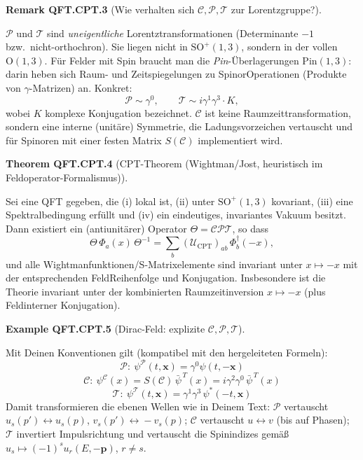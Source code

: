 \documentclass[10pt, letterpaper]{article}
\newcommand{\SO}{\mathrm{SO}}
\newcommand{\Pin}{\mathrm{Pin}}
\newcommand{\Ogroup}{\mathrm{O}}
\newcommand{\CustomHeading}[3]{%
  \par\medskip\noindent%
  \textbf{#1 #2} \textnormal{(#3)}.\enskip%
}
\newenvironment{THEO}[2]{\begin{unitbox}\CustomHeading{Theorem}{#1}{#2}}{\end{unitbox}}
\newenvironment{REM}[2]{\begin{unitbox}\CustomHeading{Remark}{#1}{#2}}{\end{unitbox}}
\newenvironment{EXA}[2]{\begin{unitbox}\CustomHeading{Example}{#1}{#2}}{\end{unitbox}}
\begin{document}
\begin{REM}{QFT.CPT.3}{Wie verhalten sich $\mathcal C,\mathcal P,\mathcal T$ zur Lorentzgruppe?}
$\mathcal P$ und $\mathcal T$ sind \emph{uneigentliche} Lorentztransformationen (Determinante $-1$ bzw.\ nicht-orthochron). Sie liegen nicht in $\SO^+(1,3)$, sondern in der vollen $\Ogroup(1,3)$. Für Felder mit Spin braucht man die \emph{Pin}-Überlagerungen $\Pin(1,3)$: darin heben sich Raum- und Zeitspiegelungen zu Spinor\-Operationen (Produkte von $\gamma$-Matrizen) an. Konkret:
\[
\mathcal P\sim \gamma^0,\qquad \mathcal T\sim i\gamma^1\gamma^3\cdot K,
\]
wobei $K$ komplexe Konjugation bezeichnet. $\mathcal C$ ist keine Raumzeittransformation, sondern eine interne (unitäre) Symmetrie, die Ladungsvorzeichen vertauscht und für Spinoren mit einer festen Matrix $S(\mathcal C)$ implementiert wird.
\end{REM}

\begin{THEO}{QFT.CPT.4}{CPT-Theorem (Wightman/Jost, heuristisch im Feldoperator-Formalismus)}
Sei eine QFT gegeben, die (i) lokal ist, (ii) unter $\SO^+(1,3)$ kovariant, (iii) eine Spektralbedingung erfüllt und (iv) ein eindeutiges, invariantes Vakuum besitzt. Dann existiert ein (antiunitärer) Operator $\Theta=\mathcal C\mathcal P\mathcal T$, so dass
\[
  \Theta\,\Phi_a(x)\,\Theta^{-1} = \sum_b (\mathcal U_{\mathrm{CPT}})_{ab}\, \Phi_b^\dagger(-x),
\]
und alle Wightmanfunktionen/S-Matrixelemente sind invariant unter $x\mapsto -x$ mit der entsprechenden Feld\-Reihenfolge und Konjugation. Insbesondere ist die Theorie invariant unter der kombinierten Raumzeitinversion $x\mapsto -x$ (plus Feldinterner Konjugation).
\end{THEO}

\begin{EXA}{QFT.CPT.5}{Dirac-Feld: explizite $\mathcal C,\mathcal P,\mathcal T$}
Mit Deinen Konventionen gilt (kompatibel mit den hergeleiteten Formeln):
\[
\boxed{\ \mathcal P:\ \psi^{\mathcal P}(t,\mathbf x)=\gamma^0\psi(t,-\mathbf x)\ }
\]
\[
\boxed{\ \mathcal C:\ \psi^{\mathcal C}(x)=S(\mathcal C)\,\bar\psi^{\,T}(x)=i\gamma^2\gamma^0\,\bar\psi^{\,T}(x)\ }
\]
\[
\boxed{\ \mathcal T:\ \psi^{\mathcal T}(t,\mathbf x)=\gamma^1\gamma^3\,\psi^*(-t,\mathbf x)\ }
\]
Damit transformieren die ebenen Wellen wie in Deinem Text: $\mathcal P$ vertauscht $u_s(p')\!\leftrightarrow\! u_s(p)$, $v_s(p')\!\leftrightarrow\!-v_s(p)$; $\mathcal C$ vertauscht $u\leftrightarrow v$ (bis auf Phasen); $\mathcal T$ invertiert Impulsrichtung und vertauscht die Spinindizes gemäß $u_s\mapsto(-1)^s u_r(E,-\mathbf p)$, $r\neq s$.
\end{EXA}
\end{document}
